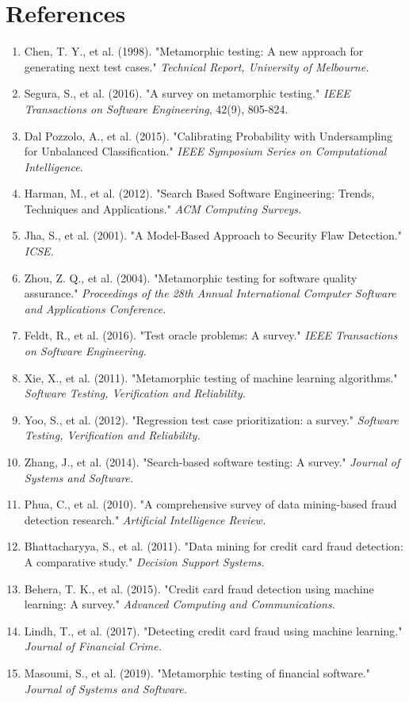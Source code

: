 \documentclass[review]{elsarticle}
\begin{document}
\section*{References}
\begin{enumerate}
    \item Chen, T. Y., et al. (1998). "Metamorphic testing: A new approach for generating next test cases." \textit{Technical Report, University of Melbourne.}
    \item Segura, S., et al. (2016). "A survey on metamorphic testing." \textit{IEEE Transactions on Software Engineering}, 42(9), 805-824.
    \item Dal Pozzolo, A., et al. (2015). "Calibrating Probability with Undersampling for Unbalanced Classification." \textit{IEEE Symposium Series on Computational Intelligence.}
    \item Harman, M., et al. (2012). "Search Based Software Engineering: Trends, Techniques and Applications." \textit{ACM Computing Surveys.}
    \item Jha, S., et al. (2001). "A Model-Based Approach to Security Flaw Detection." \textit{ICSE.}
    \item Zhou, Z. Q., et al. (2004). "Metamorphic testing for software quality assurance." \textit{Proceedings of the 28th Annual International Computer Software and Applications Conference.}
    \item Feldt, R., et al. (2016). "Test oracle problems: A survey." \textit{IEEE Transactions on Software Engineering.}
    \item Xie, X., et al. (2011). "Metamorphic testing of machine learning algorithms." \textit{Software Testing, Verification and Reliability.}
    \item Yoo, S., et al. (2012). "Regression test case prioritization: a survey." \textit{Software Testing, Verification and Reliability.}
    \item Zhang, J., et al. (2014). "Search-based software testing: A survey." \textit{Journal of Systems and Software.}
    \item Phua, C., et al. (2010). "A comprehensive survey of data mining-based fraud detection research." \textit{Artificial Intelligence Review.}
    \item Bhattacharyya, S., et al. (2011). "Data mining for credit card fraud detection: A comparative study." \textit{Decision Support Systems.}
    \item Behera, T. K., et al. (2015). "Credit card fraud detection using machine learning: A survey." \textit{Advanced Computing and Communications.}
    \item Lindh, T., et al. (2017). "Detecting credit card fraud using machine learning." \textit{Journal of Financial Crime.}
    \item Masoumi, S., et al. (2019). "Metamorphic testing of financial software." \textit{Journal of Systems and Software.}
\end{enumerate}
\end{document}
